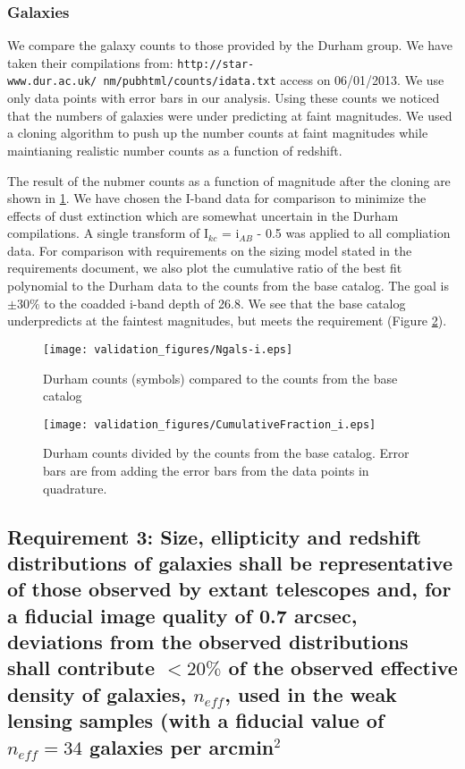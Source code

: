 \documentclass[]{article}
\begin{document}
\subsubsection{Galaxies \label{sec:galcounts}}
We compare the galaxy counts to those provided by the Durham group.  We have taken their compilations from:
{\tt http://star-www.dur.ac.uk/~nm/pubhtml/counts/idata.txt} access on 06/01/2013.  We use only data points with error bars in our analysis.  Using these counts
we noticed that the numbers of galaxies were under predicting at faint magnitudes.  We used a cloning algorithm to push up the number counts at faint magnitudes
while maintianing realistic number counts as a function of redshift.

The result of the nubmer counts as a function of magnitude after the cloning are shown in \ref{fig:gcounts}.  We have chosen the I-band data for comparison to 
minimize the effects of dust extinction which are somewhat uncertain in the Durham compilations.  A single transform of I$_{kc}$ = i$_{AB}$ - 0.5 was applied to
all compliation data.  For comparison with requirements on the sizing model stated in the requirements document, we also plot the cumulative ratio of the best fit polynomial
to the Durham data to the counts from the base catalog.  The goal is $\pm30\%$ to the coadded i-band depth of 26.8.  We see that the base catalog
underpredicts at the faintest magnitudes, but meets the requirement (Figure \ref{fig:gratio}).

\begin{figure}
\centering
\texttt{[image: validation\_figures/Ngals-i.eps]}
\caption{Durham counts (symbols) compared to the counts from the base catalog \label{fig:gcounts}}
\end{figure}
\begin{figure}
\centering
\texttt{[image: validation\_figures/CumulativeFraction\_i.eps]}
\caption{Durham counts divided by the counts from the base catalog.  Error bars are from adding the error bars from the data points in quadrature. \label{fig:gratio}}
\end{figure}

\subsection{Requirement 3: Size, ellipticity and redshift distributions of galaxies shall be representative of those observed by extant
telescopes and, for a fiducial image quality of 0.7 arcsec, deviations from the observed distributions shall
contribute $< 20\%$ of the observed effective density of galaxies, $n_{eff}$, used in the weak lensing samples (with a fiducial value of
$n_{eff} = 34$ galaxies per arcmin$^2$}
\end{document}
